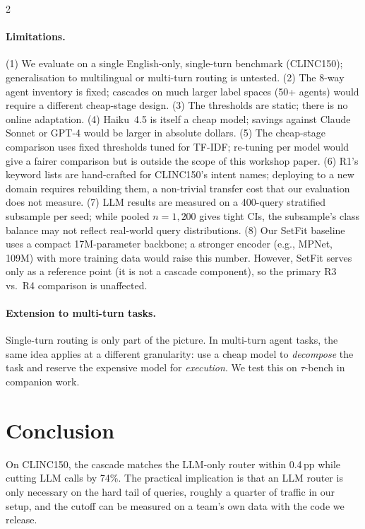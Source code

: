 \documentclass[11pt,a4paper]{article}
\begin{document}
\begin{multicols}{2}
\paragraph{Limitations.}
(1) We evaluate on a single English-only, single-turn benchmark (CLINC150); generalisation to multilingual or multi-turn routing is untested.
(2) The 8-way agent inventory is fixed; cascades on much larger label spaces (50+ agents) would require a different cheap-stage design.
(3) The thresholds are static; there is no online adaptation.
(4) Haiku~4.5 is itself a cheap model; savings against Claude Sonnet or GPT-4 would be larger in absolute dollars.
(5) The cheap-stage comparison uses fixed thresholds tuned for TF-IDF; re-tuning per model would give a fairer comparison but is outside the scope of this workshop paper.
(6) R1's keyword lists are hand-crafted for CLINC150's intent names; deploying to a new domain requires rebuilding them, a non-trivial transfer cost that our evaluation does not measure.
(7) LLM results are measured on a 400-query stratified subsample per seed; while pooled $n = 1{,}200$ gives tight CIs, the subsample's class balance may not reflect real-world query distributions.
(8) Our SetFit baseline uses a compact 17M-parameter backbone; a stronger encoder (e.g., MPNet, 109M) with more training data would raise this number. However, SetFit serves only as a reference point (it is not a cascade component), so the primary R3 vs.\ R4 comparison is unaffected.

\paragraph{Extension to multi-turn tasks.}
Single-turn routing is only part of the picture. In multi-turn agent tasks, the same idea applies at a different granularity: use a cheap model to \emph{decompose} the task and reserve the expensive model for \emph{execution}. We test this on $\tau$-bench \citep{sierra2024taubench} in companion work.

\section{Conclusion}

On CLINC150, the cascade matches the LLM-only router within 0.4\,pp while cutting LLM calls by 74\%. The practical implication is that an LLM router is only necessary on the hard tail of queries, roughly a quarter of traffic in our setup, and the cutoff can be measured on a team's own data with the code we release.


\end{multicols}
\end{document}
